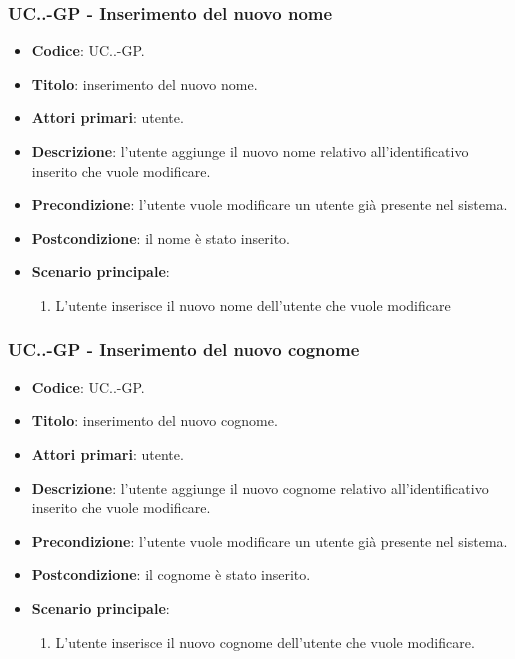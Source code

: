 			\subsubsection{UC\theuccount.\thesubuccount.\thesubsubuccount-GP - Inserimento del nuovo nome}
				\begin{itemize}
					\item \textbf{Codice}: UC\theuccount.\thesubuccount.\thesubsubuccount-GP.
					\item \textbf{Titolo}: inserimento del nuovo nome.
					\item \textbf{Attori primari}: utente.
					\item \textbf{Descrizione}: l'utente aggiunge il nuovo nome relativo all'identificativo inserito che vuole modificare.
					\item \textbf{Precondizione}: l'utente vuole modificare un utente già presente nel sistema.
					\item \textbf{Postcondizione}: il nome è stato inserito.
					\item \textbf{Scenario principale}:
					\begin{enumerate}
						\item L'utente inserisce il nuovo nome dell'utente che vuole modificare
					\end{enumerate}
				\end{itemize}


			\subsubsection{UC\theuccount.\thesubuccount.\thesubsubuccount-GP - Inserimento del nuovo cognome}
				\begin{itemize}
					\item \textbf{Codice}: UC\theuccount.\thesubuccount.\thesubsubuccount-GP.
					\item \textbf{Titolo}: inserimento del nuovo cognome.
					\item \textbf{Attori primari}: utente.
					\item \textbf{Descrizione}: l'utente aggiunge il nuovo cognome relativo all'identificativo inserito che vuole modificare.
					\item \textbf{Precondizione}: l'utente vuole modificare un utente già presente nel sistema.
					\item \textbf{Postcondizione}: il cognome è stato inserito.
					\item \textbf{Scenario principale}:
					\begin{enumerate}
						\item L'utente inserisce il nuovo cognome dell'utente che vuole modificare.
					\end{enumerate}
				\end{itemize}

